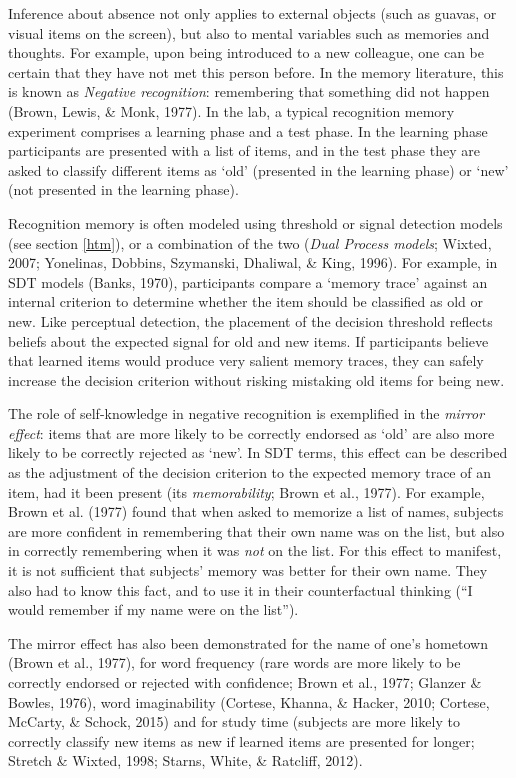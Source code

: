 \documentclass[12pt,twoside]{reedthesis}
\begin{document}
Inference about absence not only applies to external objects (such as guavas, or visual items on the screen), but also to mental variables such as memories and thoughts. For example, upon being introduced to a new colleague, one can be certain that they have not met this person before. In the memory literature, this is known as \emph{Negative recognition}: remembering that something did not happen (Brown, Lewis, \& Monk, 1977). In the lab, a typical recognition memory experiment comprises a learning phase and a test phase. In the learning phase participants are presented with a list of items, and in the test phase they are asked to classify different items as `old' (presented in the learning phase) or `new' (not presented in the learning phase).

Recognition memory is often modeled using threshold or signal detection models (see section \ref{htm}), or a combination of the two (\emph{Dual Process models}; Wixted, 2007; Yonelinas, Dobbins, Szymanski, Dhaliwal, \& King, 1996). For example, in SDT models (Banks, 1970), participants compare a `memory trace' against an internal criterion to determine whether the item should be classified as old or new. Like perceptual detection, the placement of the decision threshold reflects beliefs about the expected signal for old and new items. If participants believe that learned items would produce very salient memory traces, they can safely increase the decision criterion without risking mistaking old items for being new.

The role of self-knowledge in negative recognition is exemplified in the \emph{mirror effect}: items that are more likely to be correctly endorsed as `old' are also more likely to be correctly rejected as `new'. In SDT terms, this effect can be described as the adjustment of the decision criterion to the expected memory trace of an item, had it been present (its \emph{memorability}; Brown et al., 1977). For example, Brown et al. (1977) found that when asked to memorize a list of names, subjects are more confident in remembering that their own name was on the list, but also in correctly remembering when it was \emph{not} on the list. For this effect to manifest, it is not sufficient that subjects' memory was better for their own name. They also had to know this fact, and to use it in their counterfactual thinking (``I would remember if my name were on the list'').

The mirror effect has also been demonstrated for the name of one's hometown (Brown et al., 1977), for word frequency (rare words are more likely to be correctly endorsed or rejected with confidence; Brown et al., 1977; Glanzer \& Bowles, 1976), word imaginability (Cortese, Khanna, \& Hacker, 2010; Cortese, McCarty, \& Schock, 2015) and for study time (subjects are more likely to correctly classify new items as new if learned items are presented for longer; Stretch \& Wixted, 1998; Starns, White, \& Ratcliff, 2012).
\end{document}
